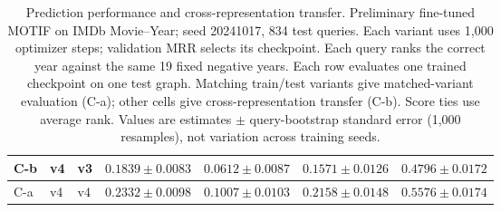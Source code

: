\begin{table}[htbp]
\begin{adjustbox}{max width=\linewidth}
\begin{tabular}{|l|l|l|l|l|l|l|}
\hline
C-b & v4 & v3 & $0.1839 \pm 0.0083$ & $0.0612 \pm 0.0087$ & $0.1571 \pm 0.0126$ & $0.4796 \pm 0.0172$ \\
\hline
C-a & v4 & v4 & $0.2332 \pm 0.0098$ & $0.1007 \pm 0.0103$ & $0.2158 \pm 0.0148$ & $0.5576 \pm 0.0174$ \\
\hline
\end{tabular}
\end{adjustbox}
\caption{Prediction performance and cross-representation transfer. Preliminary fine-tuned MOTIF on IMDb Movie--Year; seed 20241017, 834 test queries. Each variant uses 1,000 optimizer steps; validation MRR selects its checkpoint. Each query ranks the correct year against the same 19 fixed negative years. Each row evaluates one trained checkpoint on one test graph. Matching train/test variants give matched-variant evaluation (C-a); other cells give cross-representation transfer (C-b). Score ties use average rank. Values are estimates $\pm$ query-bootstrap standard error (1,000 resamples), not variation across training seeds.}
\label{tab:motif-imdb-movie-year-matrix-transfer-performance}
\end{table}
